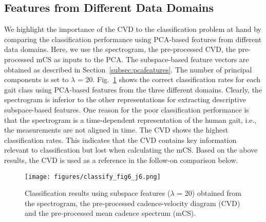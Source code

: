 \subsection{Features from Different Data Domains}
We highlight the importance of the CVD to the classification problem at hand by comparing the classification performance using PCA-based features from different data domains. Here, we use the spectrogram, the pre-processed CVD, the pre-processed mCS as inputs to the PCA. The subspace-based feature vectors are obtained as described in Section~\ref{subsec:pcafeatures}. The number of principal components is set to $\lambda$ = 20. Fig.~\ref{fig:compare_domains} shows the correct classification rates for each gait class using PCA-based features from the three different domains. Clearly, the spectrogram is inferior to the other representations for extracting descriptive subspace-based features. One reason for the poor classification performance is that the spectrogram is a time-dependent representation of the human gait, i.e., the measurements are not aligned in time. The CVD shows the highest classification rates. This indicates that the CVD contains key information relevant to classification but lost when calculating the mCS. Based on the above results, the CVD is used as a reference in the follow-on comparison below.

\begin{figure}[!t]
	\centering 
	\vspace{-0.5em}
	\texttt{[image: figures/classify\_fig6\_j6.png]}
	\caption{Classification results using subspace features ($\lambda$ = 20) obtained from the spectrogram, the pre-processed cadence-velocity diagram (CVD) and the pre-processed mean cadence spectrum (mCS).
	\label{fig:compare_domains}}
\end{figure}
